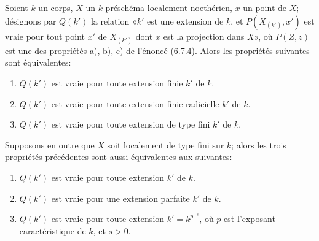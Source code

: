 \begin{proposition}[6.7.7]
\label{IV.2.s6.7.7-fr}
Soient $k$ un corps, $X$ un $k$-préschéma localement noethérien, $x$ un
point de $X$; désignons par $Q(k')$ la relation «$k'$ est une extension de
$k$, et $P(X_{(k')},x')$ est vraie pour tout point $x'$ de $X_{(k')}$ dont
$x$ est la projection dans $X$», où $P(Z,z)$ est une des propriétés a),
b), c) de l'énoncé (6.7.4). Alors les propriétés suivantes sont équivalentes:
\begin{enumerate}
\item[a)] $Q(k')$ est vraie pour toute extension finie $k'$ de $k$.
\item[b)] $Q(k')$ est vraie pour toute extension finie radicielle $k'$ de $k$.
\item[c)] $Q(k')$ est vraie pour toute extension de type fini $k'$ de $k$.
\end{enumerate}
Supposons en outre que $X$ soit localement de type fini sur $k$; alors les
trois propriétés précédentes sont aussi équivalentes aux suivantes:
\begin{enumerate}
\item[d)] $Q(k')$ est vraie pour toute extension $k'$ de $k$.
\item[e)] $Q(k')$ est vraie pour une extension parfaite $k'$ de $k$.
\item[f)] $Q(k')$ est vraie pour toute extension $k'=k^{p^{-s}}$, où $p$ est
l'exposant caractéristique de $k$, et $s>0$.
\end{enumerate}
\end{proposition}


